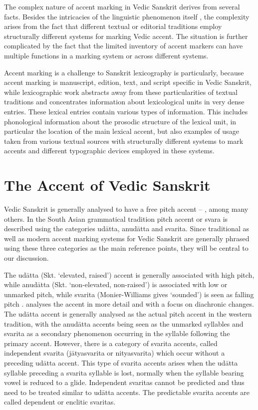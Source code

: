 The complex nature of accent marking in Vedic Sanskrit derives from several facts. Besides the intricacies of the linguistic phenomenon itself \citep[see][among others]{Kiparsky1973}, the complexity arises from the fact that different textual or editorial traditions employ structurally different systems for marking Vedic accent. The situation is further complicated by the fact that the limited inventory of accent markers can have multiple functions in a marking system or across different systems.

Accent marking is a challenge to Sanskrit lexicography is particularly, because accent marking is manu\-script, edition, text, and script specific in Vedic Sanskrit, while lexicographic work abstracts away from these particularities of textual traditions and concentrates information about lexicological units in very dense entries. These lexical entries contain various types of information. This includes phonological information about the prosodic structure of the lexical unit, in particular the location of the main lexical accent, but also examples of usage taken from various textual sources with structurally different systems to mark accents and different typographic devices employed in these systems.

\section{The Accent of Vedic Sanskrit}

Vedic Sanskrit is generally analysed to have a free pitch accent – \citet{Kiparsky1973}, \citet{Lubotsky1988} among many others. In the South Asian grammatical tradition pitch accent or svara is described using the categories udātta, anudātta and svarita. Since traditional as well as modern accent marking systems for Vedic Sanskrit are generally phrased using these three categories as the main reference points, they will be central to our discussion.

The udātta (Skt. ‘elevated, raised’) accent is generally associated with high pitch, while anudātta (Skt. ‘non-elevated, non-raised’) is associated with low or unmarked pitch, while svarita (Monier-Williams gives ‘sounded’) is seen as falling pitch \citep[p.~27]{Whitney1869}. \citet{Kiparsky1973} analyses the accent in more detail and with a focus on diachronic changes. The udātta accent is generally analysed as the actual pitch accent in the western tradition, with the anudātta accents being seen as the unmarked syllables and svarita as a secondary phenomenon occurring in the syllable following the primary accent. However, there is a category of svarita accents, called independent svarita (jātyasvarita or nityasvarita) which occur without a preceding udātta accent. This type of svarita accents arises when the udātta syllable preceding a svarita syllable is lost, normally when the syllable bearing vowel is reduced to a glide. Independent svaritas cannot be predicted and thus need to be treated similar to udātta accents. The predictable svarita accents are called dependent or enclitic svaritas.

